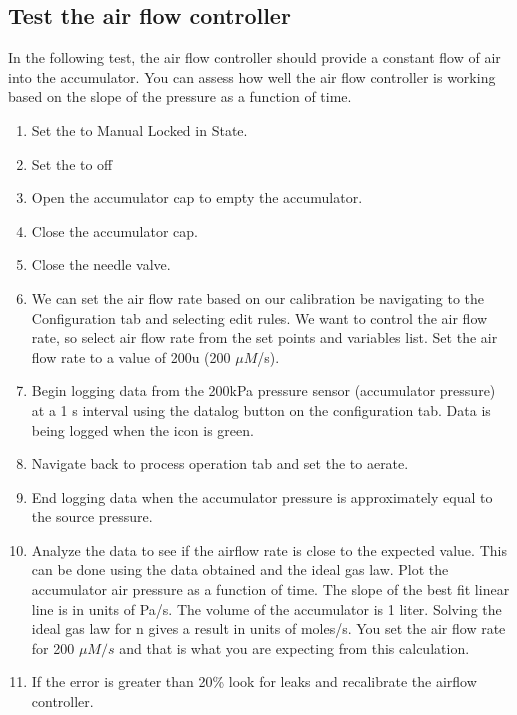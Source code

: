 \documentclass[letterpaper,10pt,english]{sphinxmanual}
\begin{document}
\subsection{Test the air flow controller}
\label{\detokenize{Gas_Transfer/Gas_Transfer:test-the-air-flow-controller}}
In the following test, the air flow controller should provide a constant flow of air into the accumulator. You can assess how well the air flow controller is working based on the slope of the pressure as a function of time.
\begin{enumerate}
\item {} 
Set the  to Manual Locked in State.

\item {} 
Set the  to off

\item {} 
Open the accumulator cap to empty the accumulator.

\item {} 
Close the accumulator cap.

\item {} 
Close the needle valve.

\item {} 
We can set the air flow rate based on our calibration be navigating to the Configuration tab and selecting edit rules. We want to control the air flow rate, so select air flow rate from the set points and variables list. Set the air flow rate to a value of 200u (200 \(\mu M\)/s).

\item {} 
Begin logging data from the 200kPa pressure sensor (accumulator pressure) at a 1 s interval using the datalog button on the configuration tab. Data is being logged when the icon is green.

\item {} 
Navigate back to process operation tab and set the  to aerate.

\item {} 
End logging data when the accumulator pressure is approximately equal to the source pressure.

\item {} 
Analyze the data to see if the airflow rate is close to the expected value. This can be done using the data obtained and the ideal gas law.  Plot the accumulator air pressure as a function of time.  The slope of the best fit linear line is in units of Pa/s.  The volume of the accumulator is 1 liter.  Solving the ideal gas law for n gives a result in units of moles/s. You set the air flow rate for 200 \(\mu M/s\) and that is what you are expecting from this calculation.

\item {} 
If the error is greater than 20\% look for leaks and recalibrate the airflow controller.

\end{enumerate}
\end{document}
